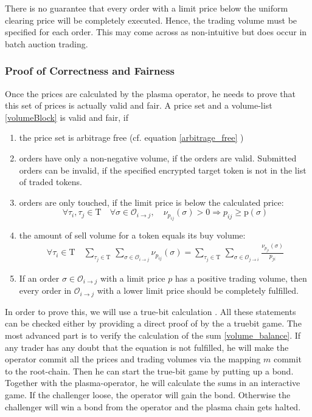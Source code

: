 \documentclass[11pt,parskip=full]{scrartcl}%
\newcommand{\Tau}{\mathrm{T}}
\def\pO{\mathcal{O}}
\def\ra{\rightarrow}
\begin{document}
There is no guarantee that every order with a limit price below the uniform clearing price will be completely executed. Hence, the trading volume must be specified for each order.
This may come across as non-intuitive but does occur in batch auction trading.


\subsubsection*{Proof of Correctness and Fairness}
\label{proofprices}
Once the prices are calculated by the plasma operator, he needs to prove that this set of prices is actually valid and fair. A price set and a volume-list \ref{volumeBlock} is valid and fair, if

\begin{enumerate}

\item the price set is arbitrage free (cf. equation \ref{arbitrage_free} )
\item orders have only a non-negative volume, if the orders are valid. Submitted orders can be invalid, if the specified encrypted target token is not in the list of traded tokens.
\item orders are only touched, if the limit price is below the calculated price:\newline
\begin{equation} \forall \tau_i ,\tau_j \in \Tau \quad \forall \sigma \in \pO_{i\ra j}, \quad \nu_{p_{ij}}(\sigma)>0 \Rightarrow p_{ij}\geq \text{p}(\sigma)
\label{limitprice_sat}
\end{equation}
\item the amount of sell volume for a token equals its buy volume: 
\begin{equation}
\begin{split}
\forall \tau_i \in \Tau \quad \sum_{\tau_j\in \Tau} \,
\sum_{ \sigma\in \pO_{i \rightarrow j}} \nu_{p_{ij}}(\sigma) = \sum_{\tau_j\in \Tau} \, \sum_{\sigma\in \pO_{j\rightarrow i}} \frac{\nu_{p_{ji}}(\sigma)}{p_{ji}}
\label{volume_balance}
\end{split}
\end{equation}
\item If an order $\sigma \in \pO_{i\rightarrow j}$ with a limit price $p$ has a positive trading volume, then every order in $\pO_{i\rightarrow j}$ with a lower limit price should be completely fulfilled. 
\end{enumerate}


In order to prove this, we will use a true-bit calculation \cite{truebit}. All these statements can be checked either by providing a direct proof of by the a truebit game. The most advanced part is to verify the calculation of the sum \ref{volume_balance}. If any trader has any doubt that the equation is not fulfilled, he will make the operator commit all the prices and trading volumes via the mapping $m$ commit to the root-chain. Then he can start the true-bit game by putting up a bond. Together with the plasma-operator, he will calculate the sums in an interactive game. If the challenger loose, the operator will gain the bond. Otherwise the challenger will win a bond from the operator and the plasma chain gets halted.
\end{document}
